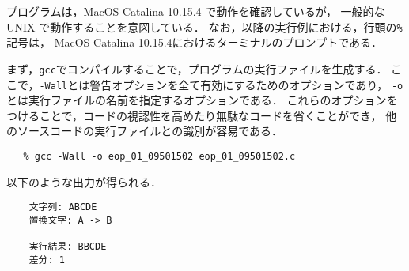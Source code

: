 プログラムは，MacOS Catalina 10.15.4 で動作を確認しているが，
一般的な UNIX で動作することを意図している．
なお，以降の実行例における，行頭の\verb|%|記号は，
MacOS Catalina 10.15.4におけるターミナルのプロンプトである．

まず，\verb|gcc|でコンパイルすることで，プログラムの実行ファイルを生成する．
ここで，\verb|-Wall|とは警告オプションを全て有効にするためのオプションであり，
\verb|-o|とは実行ファイルの名前を指定するオプションである．
これらのオプションをつけることで，コードの視認性を高めたり無駄なコードを省くことができ，
他のソースコードの実行ファイルとの識別が容易である．

{\fontsize{10pt}{11pt} \selectfont
 \begin{verbatim}
   % gcc -Wall -o eop_01_09501502 eop_01_09501502.c
 \end{verbatim}
}





\noindent %
以下のような出力が得られる．

{\fontsize{10pt}{11pt} \selectfont
 \begin{verbatim}
    文字列: ABCDE
    置換文字: A -> B

    実行結果: BBCDE
    差分: 1
 \end{verbatim}
}

